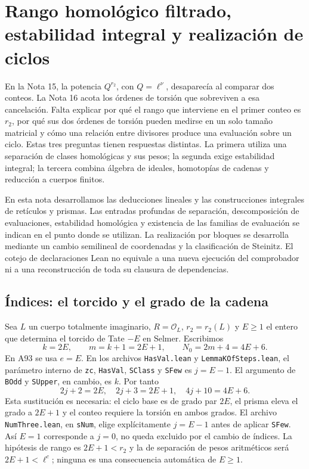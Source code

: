 \section{Rango homológico filtrado, estabilidad integral y realización de ciclos}
\label{sec:rango-homologico-ciclos}

En la Nota 15, la potencia $Q^{r_2}$, con $Q=\ell^\nu$, desaparecía al comparar dos conteos. La Nota 16 acota los órdenes de torsión que sobreviven a esa cancelación. Falta explicar por qué el rango que interviene en el primer conteo es $r_2$, por qué sus dos órdenes de torsión pueden medirse en un solo tamaño matricial y cómo una relación entre divisores produce una evaluación sobre un ciclo. Estas tres preguntas tienen respuestas distintas. La primera utiliza una separación de clases homológicas y sus pesos; la segunda exige estabilidad integral; la tercera combina álgebra de ideales, homotopías de cadenas y reducción a cuerpos finitos.

En esta nota desarrollamos las deducciones lineales y las construcciones integrales de retículos y prismas. Las entradas profundas de separación, descomposición de evaluaciones, estabilidad homológica y existencia de las familias de evaluación se indican en el punto donde se utilizan. La realización por bloques se desarrolla mediante un cambio semilineal de coordenadas y la clasificación de Steinitz. El cotejo de declaraciones Lean no equivale a una nueva ejecución del comprobador ni a una reconstrucción de toda su clausura de dependencias.

\subsection{Índices: el torcido y el grado de la cadena}

Sea $L$ un cuerpo totalmente imaginario, $R=\mathcal O_L$, $r_2=r_2(L)$ y $E\ge1$ el entero que determina el torcido de Tate $-E$ en Selmer. Escribimos
\begin{equation}
 k=2E,\qquad m=k+1=2E+1,\qquad N_0=2m+4=4E+6.
 \label{eq:rh-indices}
\end{equation}
En A93 se usa $e=E$. En los archivos \texttt{HasVal.lean} y \texttt{LemmaKOfSteps.lean}, el parámetro interno de \texttt{zc}, \texttt{HasVal}, \texttt{SClass} y \texttt{SFew} es $j=E-1$. El argumento de \texttt{BOdd} y \texttt{SUpper}, en cambio, es $k$. Por tanto
\begin{equation}
 2j+2=2E,\quad 2j+3=2E+1,\quad 4j+10=4E+6.
 \label{eq:rh-diccionario}
\end{equation}
Esta sustitución es necesaria: el ciclo base es de grado par $2E$, el prisma eleva el grado a $2E+1$ y el conteo requiere la torsión en ambos grados. El archivo \texttt{NumThree.lean}, en \texttt{sNum}, elige explícitamente $j=E-1$ antes de aplicar \texttt{SFew}. Así $E=1$ corresponde a $j=0$, no queda excluido por el cambio de índices. La hipótesis de rango es $2E+1<r_2$ y la de separación de pesos aritméticos será $2E+1<\ell^c$; ninguna es una consecuencia automática de $E\ge1$.

